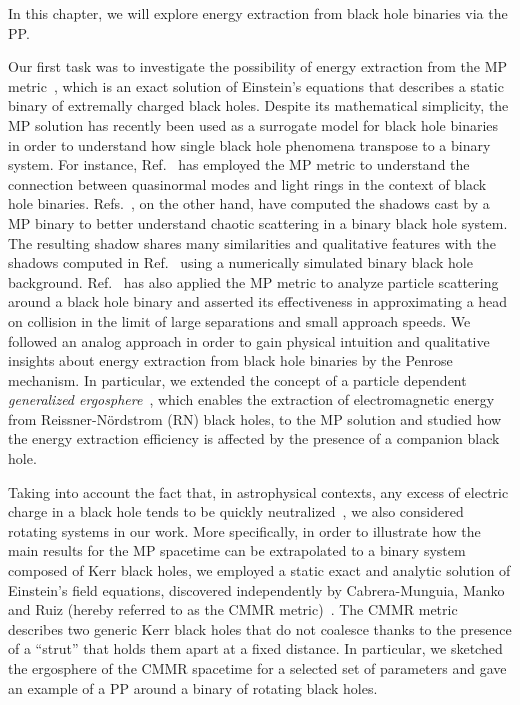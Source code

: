 In this chapter, we will explore energy extraction from black hole binaries via the \ac{PP}.

Our first task was to investigate the possibility of energy extraction from the \ac{MP} metric~\cite{MAJUMDAR1947,PAPAPETROU1947}, which is an exact solution of Einstein's equations that describes a static binary of extremally charged black holes. Despite its mathematical simplicity, the \ac{MP} solution has recently been used as a surrogate model for black hole binaries in order to understand how single black hole phenomena transpose to a binary system. For instance, Ref.~\cite{ASSUMPCAO2018} has employed the \ac{MP} metric to understand the connection between quasinormal modes and light rings in the context of black hole binaries. Refs.~\cite{Shipley:2016omi,Shipley:2019kfq}, on the other hand, have computed the shadows cast by a \ac{MP} binary to better understand chaotic scattering in a binary black hole system. The resulting shadow shares many similarities and qualitative features with the shadows computed in Ref.~\cite{Bohn:2014xxa} using a numerically simulated binary black hole background. Ref.~\cite{BINI2019} has also applied the \ac{MP} metric to analyze particle scattering around a black hole binary and asserted its effectiveness in approximating a head on collision in the limit of large separations and small approach speeds. We followed an analog approach in order to gain physical intuition and qualitative insights about energy extraction from black hole binaries by the Penrose mechanism. In particular, we extended the concept of a particle dependent \emph{generalized ergosphere}~\cite{RUFFINI1971}, which enables the extraction of electromagnetic energy from Reissner-N\"ordstrom (RN) black holes, to the \ac{MP} solution and studied how the energy extraction efficiency is affected by the presence of a companion black hole.

Taking into account the fact that, in astrophysical contexts, any excess of electric charge in a black hole tends to be quickly neutralized~\cite{gibbons1975}, we also considered rotating systems in our work. More specifically, in order to illustrate how the main results for the \ac{MP} spacetime can be extrapolated to a binary system composed of Kerr black holes, we employed a static exact and analytic solution of Einstein's field equations, discovered independently by Cabrera-Munguia, Manko and Ruiz (hereby referred to as the \ac{CMMR} metric)~\cite{cabrera_metric,manko_ruiz_metric, manko_ruiz_thermo}. The \ac{CMMR} metric describes two generic Kerr black holes that do not coalesce thanks to the presence of a ``strut'' that holds them apart at a fixed distance. In particular, we sketched the ergosphere of the \ac{CMMR} spacetime for a selected set of parameters and gave an example of a \ac{PP} around a binary of rotating black holes.

